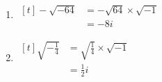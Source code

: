 \documentclass[11pt,a4paper]{book}
\begin{document}
\begin{example}
\begin{minipage}[t]{0.5\textwidth}
\end{minipage}
\begin{minipage}[t]{0.5\textwidth}

\begin{enumerate}[label=(\alph*),start=2]

\item
$
\begin{aligned}[t]
-\sqrt{-64} & =-\sqrt{64}\times\sqrt{-1}\\
 & =-8i
\end{aligned}
$

\addtocounter{enumi}{1}

\item
$
\begin{aligned}[t]
{\displaystyle \sqrt{-\frac{1}{4}}} & =\sqrt{\frac{1}{4}}\times\sqrt{-1}\\
 & =\frac{1}{2}i
\end{aligned}
$

\addtocounter{enumi}{1}

\end{enumerate}

\end{minipage}

\end{example}
\end{document}
